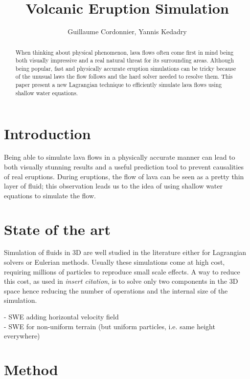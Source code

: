 \documentclass{article}
\title{Volcanic Eruption Simulation}
\author{Guillaume Cordonnier, Yannis Kedadry}
\date{}
\begin{document}
\maketitle

\begin{abstract}
When thinking about physical phenomenon, lava flows often come first in mind being both visually impressive and a real natural threat for its surrounding areas. Although being popular, fast and physically accurate eruption simulations can be tricky because of the unusual laws the flow follows and the hard solver needed to resolve them. This paper present a new Lagrangian technique to efficiently simulate lava flows using shallow water equations.
\end{abstract}

\section*{Introduction}

Being able to simulate lava flows in a physically accurate manner can lead to both visually stunning results and a useful prediction tool to prevent causalities of real eruptions. During eruptions, the flow of lava can be seen as a pretty thin layer of fluid; this observation leads us to the idea of using shallow water equations\cite{Solenthaler2011SPHBS} to simulate the flow.

\section*{State of the art}

Simulation of fluids in 3D are well studied in the literature either for Lagrangian solvers or Eulerian methods. Usually these simulations come at high cost, requiring millions of particles to reproduce small scale effects. 
A way to reduce this cost, as used in \textit{insert citation}, is to solve only two components in the 3D space hence reducing the number of operations and the internal size of the simulation. 

- SWE adding horizontal velocity field \cite{Solenthaler2011SPHBS}\\

- SWE for non-uniform terrain \cite{RodrguezPaz2005ACS} (but uniform particles, i.e. same height everywhere)

\section*{Method}
\end{document}
